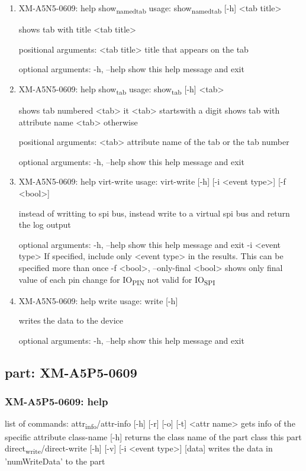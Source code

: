\documentclass[11pt]{article}
\begin{document}
\begin{enumerate}
\item XM-A5N5-0609: help show\textsubscript{named}\textsubscript{tab}
\label{sec:orgacae19f}
usage: show\textsubscript{named}\textsubscript{tab} [-h] <tab title>

shows tab with title <tab title>

positional arguments:
  <tab title>  title that appears on the tab

optional arguments:
  -h, --help   show this help message and exit

\item XM-A5N5-0609: help show\textsubscript{tab}
\label{sec:org03c5bbb}
usage: show\textsubscript{tab} [-h] <tab>

shows tab numbered <tab> it <tab> startswith a digit shows tab with attribute
name <tab> otherwise

positional arguments:
  <tab>       attribute name of the tab or the tab number

optional arguments:
  -h, --help  show this help message and exit

\item XM-A5N5-0609: help virt-write
\label{sec:orgbab51f8}
usage: virt-write [-h] [-i <event type>] [-f <bool>]

instead of writting to spi bus, instead write to a virtual spi bus and return
the log output

optional arguments:
  -h, --help            show this help message and exit
  -i <event type>       If specified, include only <event type> in the
                        results. This can be specified more than once
  -f <bool>, --only-final <bool>
                        shows only final value of each pin change for IO\textsubscript{PIN}
                        not valid for IO\textsubscript{SPI}

\item XM-A5N5-0609: help write
\label{sec:org8424007}
usage: write [-h]

writes the data to the device

optional arguments:
  -h, --help  show this help message and exit
\end{enumerate}

\subsection{part: XM-A5P5-0609}
\label{sec:org9640402}
\subsubsection{XM-A5P5-0609: help}
\label{sec:orgb0d2b8a}
list of commands:
  attr\textsubscript{info}/attr-info [-h] [-r] [-o] [-t] <attr name>
    gets info of the specific attribute
  class-name [-h]
    returns the class name of the part class this part
  direct\textsubscript{write}/direct-write [-h] [-v] [-i <event type>] [data]
    writes the data in 'numWriteData' to the part
\end{document}
